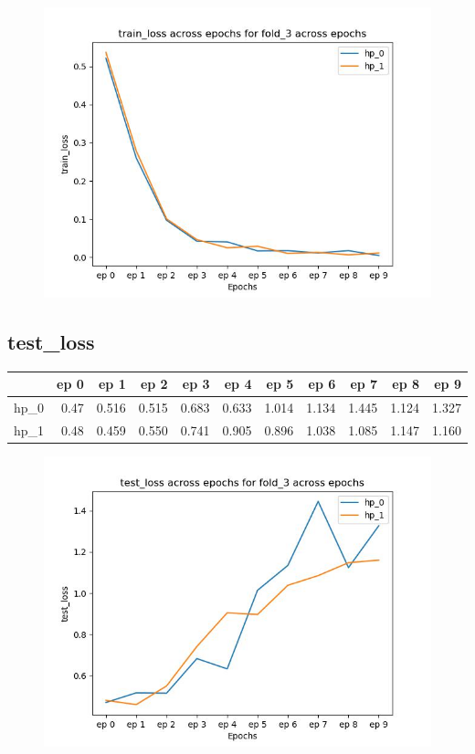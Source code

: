 \documentclass{article}
\begin{document}
\begin{figure}[H]
\includegraphics[scale = 0.75]{fold_3/train_loss}
\end{figure}
\subsection{test\_loss}
\begin{tabular}{lrrrrrrrrrr}
\toprule
{} &  ep 0 &   ep 1 &   ep 2 &   ep 3 &   ep 4 &   ep 5 &   ep 6 &   ep 7 &   ep 8 &   ep 9 \\
\midrule
hp\_0 &  0.47 &  0.516 &  0.515 &  0.683 &  0.633 &  1.014 &  1.134 &  1.445 &  1.124 &  1.327 \\
hp\_1 &  0.48 &  0.459 &  0.550 &  0.741 &  0.905 &  0.896 &  1.038 &  1.085 &  1.147 &  1.160 \\
\bottomrule
\end{tabular}

\begin{figure}[H]
\includegraphics[scale = 0.75]{fold_3/test_loss}
\end{figure}
\end{document}
